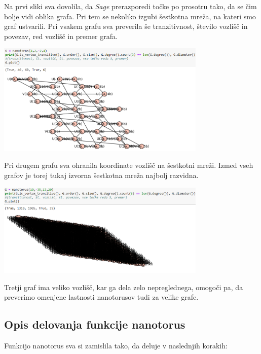 \documentclass[a4paper, 11 pt]{article}
\begin{document}
Na prvi sliki sva dovolila, da \textit{Sage} prerazporedi točke po prosotru tako, da se čim bolje vidi oblika grafa. Pri tem se nekoliko izgubi šestkotna mreža, na kateri smo graf ustvarili. Pri vsakem grafu sva preverila še tranzitivnost, število vozlišč in povezav, red vozlišč in premer grafa.
\vspace{1cm}

\begin{center}
\includegraphics[width=10cm]{nano3}
\end{center}
\vspace{1cm}

Pri drugem grafu sva ohranila koordinate vozlišč na šestkotni mreži. Izmed vseh grafov je torej tukaj izvorna šestkotna mreža najbolj razvidna.
\vspace{1cm}

\begin{center}
\includegraphics[width=10cm]{nano1}
\end{center}
\vspace{1cm}

Tretji graf ima veliko vozlišč, kar ga dela zelo nepreglednega, omogoči pa, da preverimo omenjene lastnosti nanotorusov tudi za velike grafe.

\subsection{Opis delovanja funkcije nanotorus}

Funkcijo nanotorus sva si zamislila tako, da deluje v naslednjih korakih:
\end{document}
